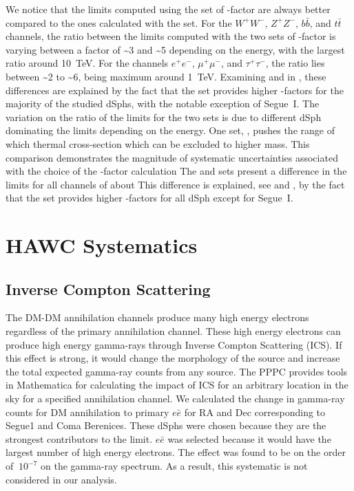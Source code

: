 We notice that the limits computed using the \B set of \J-factor are always better compared to the ones calculated with the \GS set.
For the $W^+W^-$, $Z^+Z^-$, $b\bar{b}$, and $t\bar{t}$ channels, the ratio between the limits computed with the two sets of \J-factor is varying between a factor of \textasciitilde3 and \textasciitilde5 depending on the energy, with the largest ratio around 10~TeV.
For the channels $e^+e^-$, $\mu^+\mu^-$, and $\tau^+\tau^-$, the ratio lies between \textasciitilde2 to \textasciitilde6, being maximum around 1~TeV.
Examining  and  in , these differences are explained by the fact that the \B set provides higher \J-factors for the majority of the studied dSphs, with the notable exception of Segue~I.
The variation on the ratio of the limits for the two sets is due to different dSph dominating the limits depending on the energy.
One set, \B, pushes the range of which thermal cross-section which can be excluded to higher mass.
This comparison demonstrates the magnitude of systematic uncertainties associated with the choice of the \J-factor calculation
The \GS and \B sets present a difference in the limits for all channels of about
This difference is explained, see   and , by the fact that the \B set provides higher \J-factors for all dSph except for Segue~I.

\section{HAWC Systematics} \label{sec:hawc_systematic}

\subsection{Inverse Compton Scattering} \label{sec:gd_ics}
The DM-DM annihilation channels produce many high energy electrons regardless of the primary annihilation channel.
These high energy electrons can produce high energy gamma-rays through Inverse Compton Scattering (ICS).
If this effect is strong, it would change the morphology of the source and increase the total expected gamma-ray counts from any source.
The PPPC \cite{Cirelli_2011} provides tools in Mathematica for calculating the impact of ICS for an arbitrary location in the sky for a specified annihilation channel.
We calculated the change in gamma-ray counts for DM annihilation to primary $e\bar{e}$ for RA and Dec corresponding to Segue1 and Coma Berenices.
These dSphs were chosen because they are the strongest contributors to the limit.
$e\bar{e}$ was selected because it would have the largest number of high energy electrons.
The effect was found to be on the order of $~10^{-7}$ on the gamma-ray spectrum.
As a result, this systematic is not considered in our analysis.

